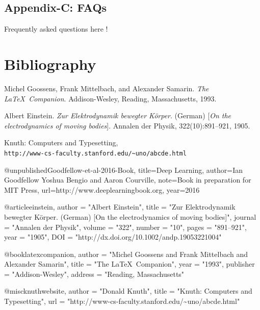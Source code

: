 \documentclass[a4paper,12pt]{report}%
\begin{document}
\section{\color{IAF} Appendix-C: FAQs}

Frequently asked questions here !



\newpage
\chapter{\color{IAF} \bf Bibliography}

%

\begin{thebibliography}{9}
Michel Goossens, Frank Mittelbach, and Alexander Samarin.
\textit{The \LaTeX\ Companion}.
Addison-Wesley, Reading, Massachusetts, 1993.

Albert Einstein.
\textit{Zur Elektrodynamik bewegter K{\"o}rper}. (German)
[\textit{On the electrodynamics of moving bodies}].
Annalen der Physik, 322(10):891–921, 1905.

Knuth: Computers and Typesetting,
\\\texttt{http://www-cs-faculty.stanford.edu/\~{}uno/abcde.html}

%
@unpublished{Goodfellow-et-al-2016-Book,
    title={Deep Learning},
    author={Ian Goodfellow Yoshua Bengio and Aaron Courville},
    note={Book in preparation for MIT Press},
    url={http://www.deeplearningbook.org},
    year={2016}
}

@article{einstein,
    author =       "Albert Einstein",
    title =        "{Zur Elektrodynamik bewegter K{\"o}rper}. ({German})
        [{On} the electrodynamics of moving bodies]",
    journal =      "Annalen der Physik",
    volume =       "322",
    number =       "10",
    pages =        "891--921",
    year =         "1905",
    DOI =          "http://dx.doi.org/10.1002/andp.19053221004"
}

@book{latexcompanion,
    author    = "Michel Goossens and Frank Mittelbach and Alexander Samarin",
    title     = "The \LaTeX\ Companion",
    year      = "1993",
    publisher = "Addison-Wesley",
    address   = "Reading, Massachusetts"
}

@misc{knuthwebsite,
    author    = "Donald Knuth",
    title     = "Knuth: Computers and Typesetting",
    url       = "http://www-cs-faculty.stanford.edu/\~{}uno/abcde.html"
}

\end{thebibliography}


\end{document}
